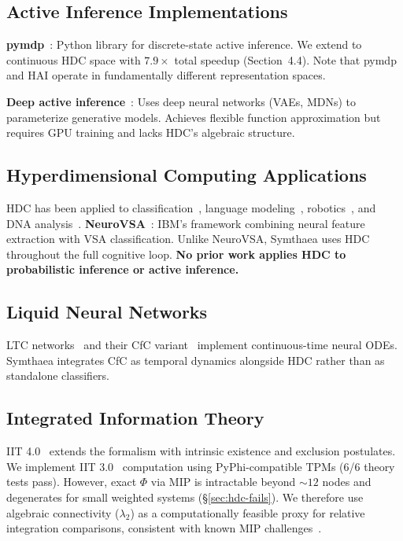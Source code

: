 \documentclass[10pt,letterpaper]{article}
\renewcommand{\Phi}{\varPhi}
\begin{document}
\subsection{Active Inference Implementations}

\textbf{pymdp}~\cite{heins2022pymdp}: Python library for discrete-state active inference. We extend to continuous HDC space with $7.9\times$ total speedup (Section~4.4). Note that pymdp and HAI operate in fundamentally different representation spaces.

\textbf{Deep active inference}~\cite{fountas2020deep,catal2020learning}: Uses deep neural networks (VAEs, MDNs) to parameterize generative models. Achieves flexible function approximation but requires GPU training and lacks HDC's algebraic structure.

\subsection{Hyperdimensional Computing Applications}

HDC has been applied to classification~\cite{rahimi2016robust,imani2019hierarchical}, language modeling~\cite{joshi2016language}, robotics~\cite{neubert2019introduction}, and DNA analysis~\cite{kim2020hdc}.
\textbf{NeuroVSA}~\cite{hersche2023neurovsa}: IBM's framework combining neural feature extraction with VSA classification. Unlike NeuroVSA, Symthaea uses HDC throughout the full cognitive loop.
\textbf{No prior work applies HDC to probabilistic inference or active inference.}

\subsection{Liquid Neural Networks}

LTC networks~\cite{hasani2021liquid} and their CfC variant~\cite{hasani2022closed} implement continuous-time neural ODEs. Symthaea integrates CfC as temporal dynamics alongside HDC rather than as standalone classifiers.

\subsection{Integrated Information Theory}

IIT 4.0~\cite{albantakis2023integrated} extends the formalism with intrinsic existence and exclusion postulates. We implement IIT 3.0~\cite{tononi2016integrated} computation using PyPhi-compatible TPMs (6/6 theory tests pass). However, exact $\Phi$ via MIP is intractable beyond ${\sim}12$ nodes and degenerates for small weighted systems (\S\ref{sec:hdc-fails}). We therefore use algebraic connectivity ($\lambda_2$) as a computationally feasible proxy for relative integration comparisons, consistent with known MIP challenges~\cite{toker2019information}.
\end{document}
